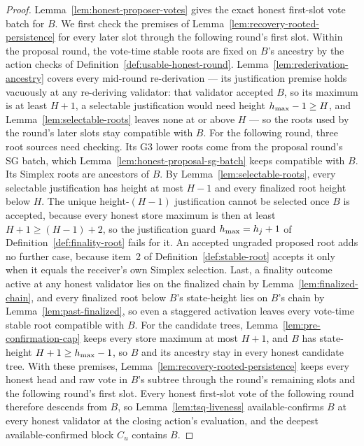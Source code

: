 \begin{proof}
Lemma~\ref{lem:honest-proposer-votes} gives the exact honest first-slot
vote batch for \(B\).  We first check the premises of
Lemma~\ref{lem:recovery-rooted-persistence} for every later slot through
the following round's first slot.  Within the proposal round, the
vote-time stable roots are fixed on \(B\)'s ancestry by the action checks
of Definition~\ref{def:usable-honest-round}.
Lemma~\ref{lem:rederivation-ancestry} covers every mid-round
re-derivation --- its justification premise holds vacuously at any
re-deriving validator: that validator accepted \(B\), so its maximum
is at least \(H+1\), a selectable justification would need height
\(h_{\max}-1\geq H\), and Lemma~\ref{lem:selectable-roots} leaves none
at or above \(H\) --- so the roots used by the round's
later slots stay compatible with \(B\).  For the following round, three root sources need checking.  Its G3
lower roots come from the proposal round's SG batch, which
Lemma~\ref{lem:honest-proposal-sg-batch} keeps compatible with \(B\).
Its Simplex roots are ancestors of \(B\).  By
Lemma~\ref{lem:selectable-roots}, every selectable justification has
height at most \(H-1\) and every finalized root height below \(H\).
The
unique height-\((H{-}1)\) justification cannot be selected once
\(B\) is accepted, because every honest store maximum is then at least
\(H+1\geq(H-1)+2\), so the justification guard \(h_{\max}=h_j+1\) of
Definition~\ref{def:finality-root} fails for it.  An accepted ungraded
proposed root adds no further case, because item~2 of
Definition~\ref{def:stable-root} accepts it only when it equals the
receiver's own Simplex selection.  Last, a finality outcome active at
any honest validator lies on the finalized chain by
Lemma~\ref{lem:finalized-chain}, and every finalized root below
\(B\)'s state-height lies on \(B\)'s chain by
Lemma~\ref{lem:past-finalized}, so even a staggered activation leaves
every vote-time stable root compatible with \(B\).  For the candidate trees,
Lemma~\ref{lem:pre-confirmation-cap} keeps every store maximum at most
\(H+1\), and \(B\) has state-height \(H+1\geq h_{\max}-1\), so \(B\) and
its ancestry stay in every honest candidate tree.  With these premises,
Lemma~\ref{lem:recovery-rooted-persistence} keeps every honest head and
raw vote in \(B\)'s subtree through the round's remaining slots and the
following round's first slot.  Every
honest first-slot vote of the following round therefore descends from
\(B\), so Lemma~\ref{lem:tsq-liveness} available-confirms \(B\) at every
honest validator at the closing action's evaluation, and the deepest
available-confirmed block \(C_u\) contains \(B\).


\end{proof}
